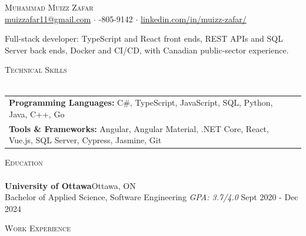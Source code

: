 \documentclass[a4paper]{article}
\newcommand{\header} [1] {
    {\hspace*{-18pt}\vspace*{6pt} \textsc{#1}}
    \vspace*{-6pt} \\
    \hspace*{-18pt} \hrulefill \\
}
\begin{document}
\vspace*{-40pt}

\vspace*{-10pt}
\begin{center}
	{\Huge \scshape {Muhammad Muizz Zafar}}\\
\faSend \space \href{mailto:muizzafar11@gmail.com}{muizzafar11@gmail.com} $\cdot$ \faPhoneSquare {}-805-9142 $\cdot$ \faLinkedinSquare \space \href{https://www.linkedin.com/in/muizz-zafar/}{linkedin.com/in/muizz-zafar/}
	\\
\end{center}
\begin{center}
Full-stack developer: TypeScript and React front ends, REST APIs and SQL Server back ends, Docker and CI/CD, with Canadian public-sector experience.
\end{center}

\header{Technical Skills}
\begin{tabular}{ l l }
\textbf{Programming Languages:} C\#, TypeScript, JavaScript, SQL, Python, Java, C++, Go \\
\textbf{Tools \& Frameworks:} Angular, Angular Material, .NET Core, React, Vue.js, SQL Server, Cypress, Jasmine, Git
\end{tabular}
\vspace{4mm}

\header{Education}
\textbf{University of Ottawa}\hfill Ottawa, ON\\
Bachelor of Applied Science, Software Engineering \textit{GPA: 3.7/4.0} \hfill Sept 2020 - Dec 2024\\
\vspace{4mm}

\header{Work Experience}
\end{document}
